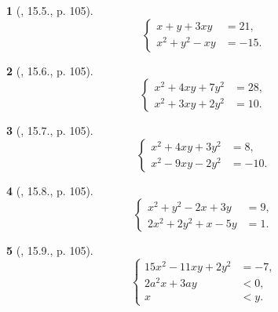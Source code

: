 \documentclass{article}
\newtheorem{baitoan}{}
\begin{document}
\begin{baitoan}[\cite{TLCT_THCS_Toan_9_dai_so}, 15.5., p. 105]
	\begin{equation*}
		\left\{\begin{split}
			x + y + 3xy &= 21,\\
			x^2 + y^2 - xy &= -15.
		\end{split}\right.
	\end{equation*}
\end{baitoan}

\begin{baitoan}[\cite{TLCT_THCS_Toan_9_dai_so}, 15.6., p. 105]
	\begin{equation*}
		\left\{\begin{split}
			x^2 + 4xy + 7y^2 &= 28,\\
			x^2 + 3xy + 2y^2 &= 10.
		\end{split}\right.
	\end{equation*}
\end{baitoan}

\begin{baitoan}[\cite{TLCT_THCS_Toan_9_dai_so}, 15.7., p. 105]
	\begin{equation*}
		\left\{\begin{split}
			x^2 + 4xy + 3y^2 &= 8,\\
			x^2 - 9xy - 2y^2 &= -10.
		\end{split}\right.
	\end{equation*}
\end{baitoan}

\begin{baitoan}[\cite{TLCT_THCS_Toan_9_dai_so}, 15.8., p. 105]
	\begin{equation*}
		\left\{\begin{split}
			x^2 + y^2 - 2x + 3y &= 9,\\
			2x^2 + 2y^2 + x - 5y &= 1.
		\end{split}\right.
	\end{equation*}
\end{baitoan}

\begin{baitoan}[\cite{TLCT_THCS_Toan_9_dai_so}, 15.9., p. 105]
	\begin{equation*}
		\left\{\begin{split}
			15x^2 - 11xy + 2y^2 &= -7,\\
			2a^2x + 3ay &< 0,\\
			x &< y.
		\end{split}\right.
	\end{equation*}
\end{baitoan}
\end{document}
